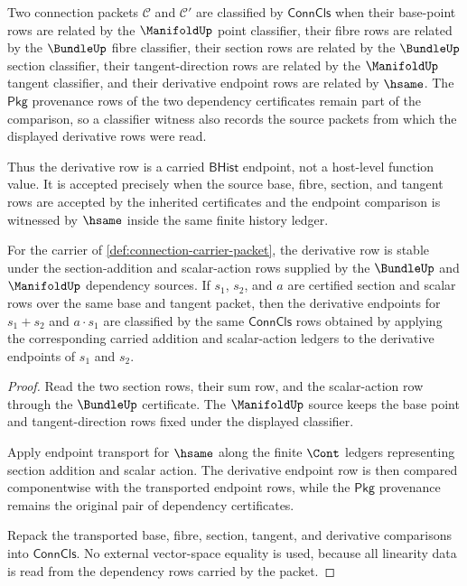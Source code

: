 \begin{definition}
\label{def:connection-classifier-and-derivative-row}
Two connection packets $\mathcal{C}$ and $\mathcal{C}'$ are classified by $\mathsf{ConnCls}$ when their base-point rows are related by the $\ManifoldUp$ point classifier, their fibre rows are related by the $\BundleUp$ fibre classifier, their section rows are related by the $\BundleUp$ section classifier, their tangent-direction rows are related by the $\ManifoldUp$ tangent classifier, and their derivative endpoint rows are related by $\hsame$. The $\mathsf{Pkg}$ provenance rows of the two dependency certificates remain part of the comparison, so a classifier witness also records the source packets from which the displayed derivative rows were read.

Thus the derivative row is a carried $\mathsf{BHist}$ endpoint, not a host-level function value. It is accepted precisely when the source base, fibre, section, and tangent rows are accepted by the inherited certificates and the endpoint comparison is witnessed by $\hsame$ inside the same finite history ledger.
\end{definition}

\begin{theorem}
\label{thm:connection-section-linearity-obligation}
For the carrier of \autoref{def:connection-carrier-packet}, the derivative row is stable under the section-addition and scalar-action rows supplied by the $\BundleUp$ and $\ManifoldUp$ dependency sources. If $s_1$, $s_2$, and $a$ are certified section and scalar rows over the same base and tangent packet, then the derivative endpoints for $s_1+s_2$ and $a\cdot s_1$ are classified by the same $\mathsf{ConnCls}$ rows obtained by applying the corresponding carried addition and scalar-action ledgers to the derivative endpoints of $s_1$ and $s_2$.
\end{theorem}
\begin{proof}
Read the two section rows, their sum row, and the scalar-action row through the $\BundleUp$ certificate. The $\ManifoldUp$ source keeps the base point and tangent-direction rows fixed under the displayed classifier.

Apply endpoint transport for $\hsame$ along the finite $\Cont$ ledgers representing section addition and scalar action. The derivative endpoint row is then compared componentwise with the transported endpoint rows, while the $\mathsf{Pkg}$ provenance remains the original pair of dependency certificates.

Repack the transported base, fibre, section, tangent, and derivative comparisons into $\mathsf{ConnCls}$. No external vector-space equality is used, because all linearity data is read from the dependency rows carried by the packet.
\end{proof}

